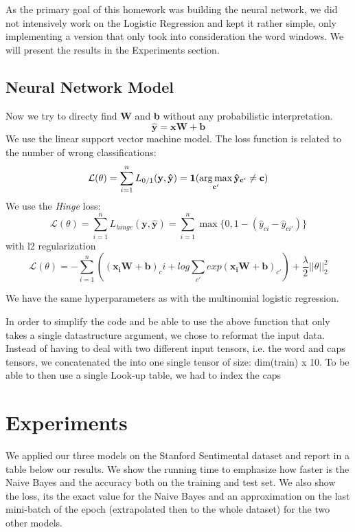 \documentclass[11pt]{article}
\begin{document}
\noindent As the primary goal of this homework was building the neural network, we did not intensively work on the Logistic Regression and kept it rather simple, only implementing a version that only took into consideration the word windows. We will present the results in the Experiments section.
 
\subsection{Neural Network Model}

Now we try to directy find \textbf{W} and \textbf{b} without any probabilistic interpretation.
\[\mathbf{\hat{y}} = \mathbf{xW} + \mathbf{b} \]
We use the linear support vector machine model. The loss function is related to the number of wrong classifications:
  \[\mathcal{L}(\theta) = \sum_{i=1}^n L_{0/1}(\mathbf{y}, \mathbf{\hat{y}}) = \mathbf{1(\argmax_{c'} \hat{y}_{c'} \neq c)}\]
  We use the \textit{Hinge} loss:
    \[\mathcal{L}(\theta) = \sum_{i=1}^n L_{hinge}(\mathbf{y},\hat{\mathbf{y}}) =  \sum_{i=1}^n \max\{0, 1 - (\hat{y}_{ci} - \hat{y}_{ci'}) \}  \]
with l2 regularization
\[ \mathcal{L}(\theta) = - \sum_{i=1}^{n} \left( (\mathbf{x_i W} + \mathbf{b})_ci + log \sum_{c'} exp(\mathbf{x_i W} + \mathbf{b})_{c'} \right) + \frac{\lambda}{2} ||\theta||_2^2\]

\noindent We have the same hyperparameters as with the multinomial logistic regression.

\noindent In order to simplify the code and be able to use the above function that only takes a single datastructure argument, we chose to reformat the input data. Instead of having to deal with two different input tensors, i.e. the word and caps tensors, we concatenated the into one single tensor of size: dim(train) x 10. To be able to then use a single Look-up table, we had to index the caps

\section{Experiments}

We applied our three models on the Stanford Sentimental dataset and report in a table below our results. We show the running time to emphasize how faster is the Naive Bayes and the accuracy both on the training and test set. We also show the loss, its the exact value for the Naive Bayes and an approximation on the last mini-batch of the epoch (extrapolated then to the whole dataset) for the two other models.\\
\end{document}
